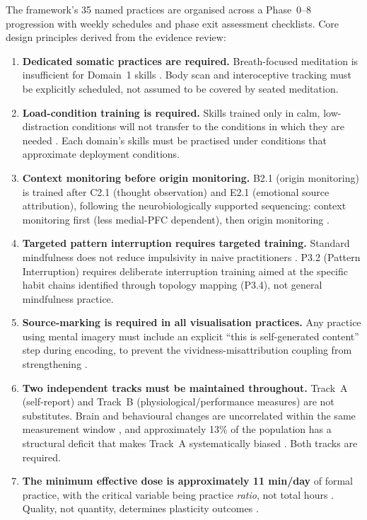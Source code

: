 \documentclass[12pt, a4paper]{article}
\begin{document}
The framework's 35 named practices are organised across a Phase~0--8 progression
with weekly schedules and phase exit assessment checklists. Core design principles
derived from the evidence review:

\begin{enumerate}[leftmargin=2em]
\item \textbf{Dedicated somatic practices are required.} Breath-focused meditation
is insufficient for Domain~1 skills \citep{ganesan2025}. Body scan and interoceptive
tracking must be explicitly scheduled, not assumed to be covered by seated meditation.

\item \textbf{Load-condition training is required.} Skills trained only in calm,
low-distraction conditions will not transfer to the conditions in which they are
needed \citep{raio2013, beyeler2017}. Each domain's skills must be practised under
conditions that approximate deployment conditions.

\item \textbf{Context monitoring before origin monitoring.} B2.1 (origin monitoring)
is trained after C2.1 (thought observation) and E2.1 (emotional source attribution),
following the neurobiologically supported sequencing: context monitoring first
(less medial-PFC dependent), then origin monitoring \citep{simons2008}.

\item \textbf{Targeted pattern interruption requires targeted training.} Standard
mindfulness does not reduce impulsivity in naive practitioners \citep{calderone2024,
gkintoni2025}. P3.2 (Pattern Interruption) requires deliberate interruption
training aimed at the specific habit chains identified through topology mapping
(P3.4), not general mindfulness practice.

\item \textbf{Source-marking is required in all visualisation practices.}
Any practice using mental imagery must include an explicit ``this is self-generated
content'' step during encoding, to prevent the vividness-misattribution coupling
from strengthening \citep{moseley2018}.

\item \textbf{Two independent tracks must be maintained throughout.} Track~A
(self-report) and Track~B (physiological/performance measures) are not substitutes.
Brain and behavioural changes are uncorrelated within the same measurement window
\citep{yue2023}, and approximately 13\% of the population has a structural deficit
that makes Track~A systematically biased \citep{buda2011}. Both tracks are required.

\item \textbf{The minimum effective dose is approximately 11 min/day} of formal
practice, with the critical variable being practice \emph{ratio}, not total hours
\citep{jha2015, jha2016, jha2017, jha2020}. Quality, not quantity, determines
plasticity outcomes \citep{fallon2009}.
\end{enumerate}
\end{document}
